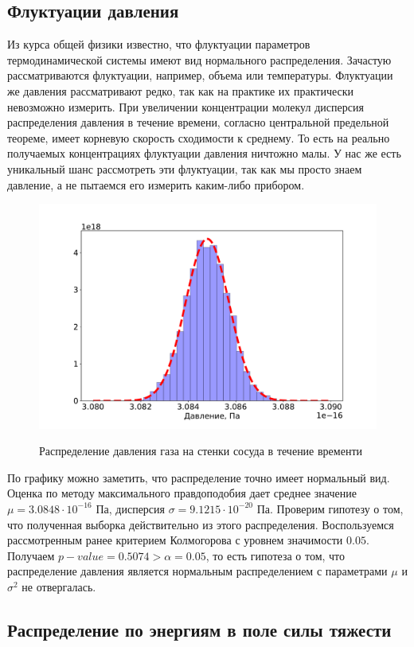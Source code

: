 \documentclass[twoside,twocolumn, 11pt]{article}
\theoremstyle{plain}
\theoremstyle{definition}
\begin{document}
\subsection{Флуктуации давления}
Из курса общей физики известно, что флуктуации параметров термодинамической системы имеют вид нормального распределения.
Зачастую рассматриваются флуктуации, например, объема или температуры. Флуктуации же давления рассматривают редко, так как на
практике их практически невозможно измерить. При увеличении концентрации молекул дисперсия распределения давления в течение времени, согласно
центральной предельной теореме, имеет корневую скорость сходимости к среднему. То есть на реально получаемых концентрациях флуктуации давления
ничтожно малы. У нас же есть уникальный шанс рассмотреть эти флуктуации, так как мы просто знаем давление, а не пытаемся его измерить каким-либо прибором.
\begin{figure}[h!]
{\includegraphics[width=1\linewidth]{hist_p}}
\caption{Распределение давления газа на стенки сосуда в течение временти}
\end{figure}
По графику можно заметить, что распределение точно имеет нормальный вид. Оценка по методу максимального правдоподобия дает
среднее значение $\mu = 3.0848 \cdot 10^{-16}$ Па, дисперсия $\sigma = 9.1215 \cdot 10^{-20}$ Па. Проверим гипотезу о том, что
полученная выборка действительно из этого распределения. Воспользуемся рассмотренным ранее критерием Колмогорова с уровнем
значимости $0.05$. Получаем $p-value = 0.5074 > \alpha = 0.05$, то есть гипотеза о том, что распределение давления является
нормальным распределением с параметрами $\mu$ и $\sigma^2$ не отвергалась.

\subsection{Распределение по энергиям в поле силы тяжести}
\end{document}
